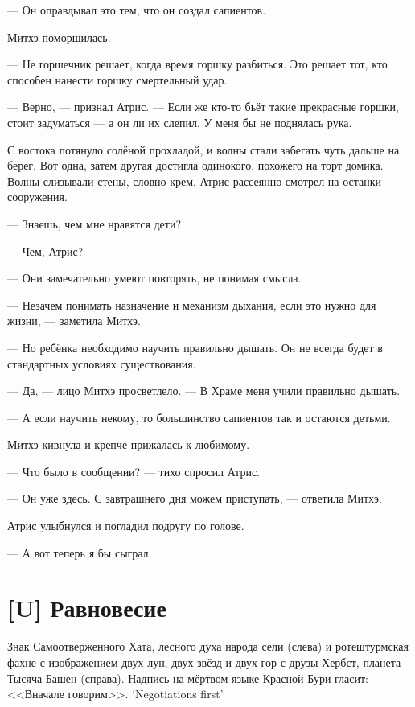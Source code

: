 --- Он оправдывал это тем, что он создал сапиентов.

Митхэ поморщилась.

--- Не горшечник решает, когда время горшку разбиться.
Это решает тот, кто способен нанести горшку смертельный удар.

--- Верно, --- признал Атрис.
--- Если же кто-то бьёт такие прекрасные горшки, стоит задуматься --- а он ли их слепил.
У меня бы не поднялась рука.

С востока потянуло солёной прохладой, и волны стали забегать чуть дальше на берег.
Вот одна, затем другая достигла одинокого, похожего на торт домика.
Волны слизывали стены, словно крем.
Атрис рассеянно смотрел на останки сооружения.

--- Знаешь, чем мне нравятся дети?

--- Чем, Атрис?

--- Они замечательно умеют повторять, не понимая смысла.

--- Незачем понимать назначение и механизм дыхания, если это нужно для жизни, --- заметила Митхэ.

--- Но ребёнка необходимо научить правильно дышать.
Он не всегда будет в стандартных условиях существования.

--- Да, --- лицо Митхэ просветлело.
--- В Храме меня учили правильно дышать.

--- А если научить некому, то большинство сапиентов так и остаются детьми.

Митхэ кивнула и крепче прижалась к любимому.

--- Что было в сообщении? --- тихо спросил Атрис.

--- Он уже здесь.
С завтрашнего дня можем приступать, --- ответила Митхэ.

Атрис улыбнулся и погладил подругу по голове.

--- А вот теперь я бы сыграл.

\chapter{[U] Равновесие}


\newpage
\thispagestyle{plain}

Знак Самоотверженного Хата, лесного духа народа сели (слева) и ротештурмская фахне с изображением двух лун, двух звёзд и двух гор с друзы Хербст, планета Тысяча Башен (справа).
Надпись на мёртвом языке Красной Бури гласит:
{<<Вначале говорим>>.}
{`Negotiations first'}
\newpage

